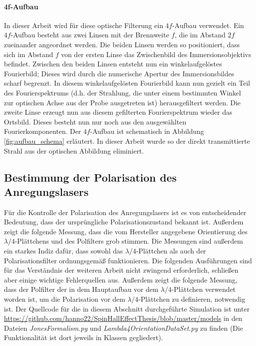 \documentclass[titlepage,  ngerman]{article}
\begin{document}
	\paragraph{4f-Aufbau}
	In dieser Arbeit wird für diese optische Filterung ein $4f$-Aufbau verwendet. Ein $4f$-Aufbau besteht aus zwei Linsen mit der Brennweite $f$, die im Abstand $2f$ zueinander angeordnet werden. Die beiden Linsen werden so positioniert, dass sich im Abstand $f$ von der ersten Linse das Zwischenbild des Immersionsobjektivs befindet. Zwischen den beiden Linsen entsteht nun ein winkelaufgelöstes Fourierbild; Dieses wird durch die numerische Apertur des Immersionsbildes scharf begrenzt.  In diesem winkelaufgelösten Fourierbild kann nun gezielt ein Teil des Fourierspektrums (d.h. der Strahlung, die unter einem bestimmten Winkel zur optischen Achse aus der Probe ausgetreten ist) herausgefiltert werden. Die zweite Linse erzeugt nun aus diesem gefilterten Fourierspektrum wieder das Ortsbild. Dieses besteht nun nur noch aus den ausgewählten Fourierkomponenten. Der $4f$-Aufbau ist schematisch in Abbildung \ref{fig:aufbau_schema} erläutert. In dieser Arbeit wurde so der direkt transmittierte Strahl aus der optischen Abbildung eliminiert.
	\subsection{Bestimmung der Polarisation des Anregungslasers}
	\label{sec:polarimeter}
	Für die Kontrolle der Polarisation des Anregungslasers ist es von entscheidender Bedeutung, dass der ursprüngliche Polarisationszustand bekannt ist. Außerdem zeigt die folgende Messung, dass die vom Hersteller angegebene Orientierung des $\lambda/4$-Plättchens und des Polfilters grob stimmen. Die Messungen sind außerdem ein starkes Indiz dafür, dass sowohl das $\lambda/4$-Plättchen als auch der Polarisationsfilter ordnungsgemäß funktionieren. Die folgenden Ausführungen sind für das Verständnis der weiteren Arbeit nicht zwingend erforderlich, schließen aber einige wichtige Fehlerquellen aus. Außerdem zeigt die folgende Messung, dass der Polfilter der in dem Hauptaufbau vor dem $\lambda / 4$-Plättchen verwendet worden ist, um die Polarisation vor dem $\lambda / 4$-Plättchen zu definieren, notwendig ist. Der Quellcode für die in diesem Abschnitt durchgeführte Simulation ist unter \url{https://github.com/hanno22/SpinHallEffectThesis/blob/master/models} in den Dateien \textit{JonesFormalism.py} und \textit{Lambda4OrientationDataSet.py} zu finden (Die Funktionalität ist dort jeweils in Klassen gegliedert).
\end{document}
